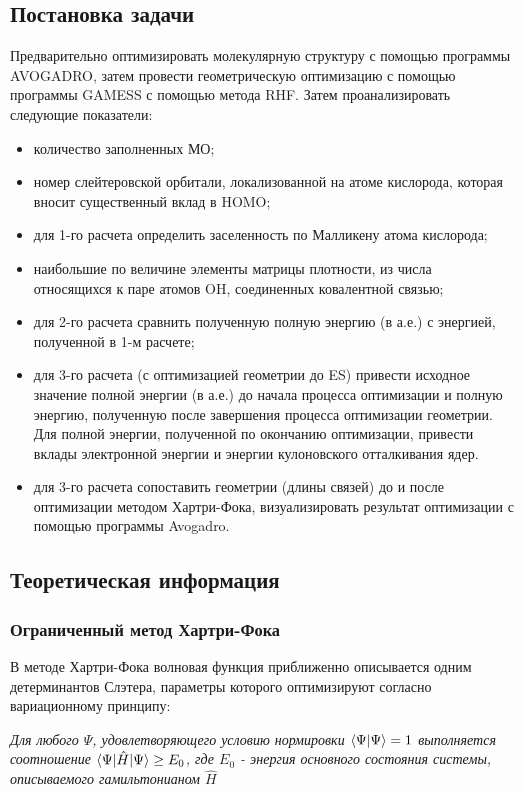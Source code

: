 \subsection{Постановка задачи}
Предварительно оптимизировать молекулярную структуру с помощью программы AVOGADRO, затем провести геометрическую оптимизацию с помощью программы GAMESS с помощью метода RHF. Затем проанализировать следующие показатели: 
\begin{itemize}
    \item количество заполненных МО; 
    \item номер слейтеровской орбитали, локализованной на атоме кислорода, которая вносит существенный вклад в HOMO;
    \item для 1-го расчета определить заселенность по Малликену атома кислорода;
    \item наибольшие по величине элементы матрицы плотности, из числа относящихся к паре атомов OH, соединенных ковалентной связью;
    \item для 2-го расчета сравнить полученную полную энергию (в а.е.) с энергией, полученной в 1-м расчете;
    \item для 3-го расчета (с оптимизацией геометрии до ES) привести исходное значение полной энергии (в а.е.) до начала процесса оптимизации и полную энергию, полученную после завершения процесса оптимизации геометрии. Для полной энергии, полученной по окончанию оптимизации, привести вклады электронной энергии и энергии кулоновского отталкивания ядер.
    \item для 3-го расчета сопоставить геометрии (длины связей) до и после оптимизации методом Хартри-Фока, визуализировать результат оптимизации с помощью программы Avogadro.
\end{itemize}


\subsection{Теоретическая информация}
\subsubsection{Ограниченный метод Хартри-Фока}
В методе Хартри-Фока волновая функция приближенно описывается одним детерминантов Слэтера, параметры которого оптимизируют согласно вариационному принципу:\par\textit{
Для любого $\Psi$, удовлетворяющего условию нормировки $\braket{\Psi|\Psi} = 1$ выполняется соотношение $\braket{\Psi|\hat{H}|\Psi} \geq E_0$, где $E_0$ - энергия основного состояния системы, описываемого гамильтонианом $\hat{H}$}

